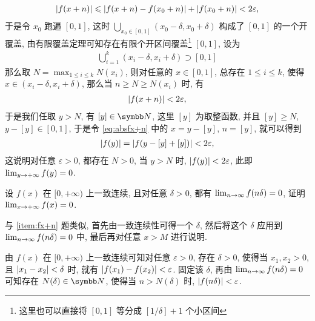\begin{exercise}[series=exer]
\begin{answer}
        \begin{align*}
            \abs{f(x + n)} \leqslant \abs{f(x + n) - f(x_{0} + n)} + \abs{f(x_{0} + n)} < 2 \varepsilon,
        \end{align*}
        于是令 $ x_{0} $ 跑遍 $ [0, 1] $, 这时 $ \bigcup_{x_{0} \in [0, 1]} (x_{0} - \delta, x_{0} + \delta) $ 构成了 $ [0, 1] $ 的一个开覆盖, 由有限覆盖定理可知存在有限个开区间覆盖\footnote{这里也可以直接将 $ [0, 1] $ 等分成 $ [1/\delta] + 1 $ 个小区间} $ [0, 1] $, 设为
        \begin{align*}
            \bigcup_{i = 1}^{k} (x_{i} - \delta, x_{i} + \delta) \supset [0, 1]
        \end{align*}
        那么取 $ N = \max_{1 \le i \le k} N(x_{i}) $, 则对任意的 $ x \in [0, 1] $, 总存在 $ 1 \le i \le k $, 使得 $ x \in (x_{i} - \delta, x_{i} + \delta) $, 那么当 $ n \ge N \ge N(x_{i}) $ 时, 有
        \begin{align}\label{eq:absfx+n}
            \abs{f(x + n)} < 2\varepsilon,
        \end{align}
        于是我们任取 $ y > N $, 有 $ [y] \in \N $, 这里 $ [y] $ 为取整函数, 并且 $ [y] \ge N $, $ y - [y] \in [0, 1] $, 于是令 \eqref{eq:absfx+n} 中的 $ x = y - [y] $, $ n = [y] $, 就可以得到
        \begin{align*}
            \abs{f(y)} = \abs{f(y - [y] + [y])} < 2\varepsilon, 
        \end{align*}
        这说明对任意 $ \varepsilon > 0 $, 都存在 $ N > 0 $, 当 $ y > N $ 时, $ \abs{f(y)} < 2\varepsilon $, 此即 $ \lim_{y \to +\infty}f(y) = 0 $. 
    \end{answer}
    \item 设 $ f(x) $ 在 $ [0, +\infty) $ 上一致连续, 且对任意 $ \delta > 0 $, 都有 $ \lim_{n \to \infty} f(n\delta) = 0 $, 证明 $ \lim_{x \to +\infty} f(x) = 0 $. 
    \begin{hint}
        与 \ref{item:fx+n} 题类似, 首先由一致连续性可得一个 $ \delta $, 然后将这个 $ \delta $ 应用到 $ \lim_{n \to \infty} f(n\delta) = 0 $ 中, 最后再对任意 $ x > M $ 进行说明.
    \end{hint}
    \begin{answer}
        由 $ f(x) $ 在 $ [0, +\infty) $ 上一致连续可知对任意 $ \varepsilon > 0 $, 存在 $ \delta > 0 $, 使得当 $ x_{1}, x_{2} > 0 $, 且 $ \abs{x_{1} - x_{2}} < \delta $ 时, 就有 $ \abs{f(x_{1}) - f(x_{2})} < \varepsilon $. 固定该 $ \delta $, 再由 $ \lim_{n \to \infty}f(n\delta) = 0 $ 可知存在 $ N(\delta) \in \N $, 使得当 $ n > N(\delta) $ 时, $ \abs{f(n\delta)} < \varepsilon $. 
        

\end{answer}
\end{exercise}
